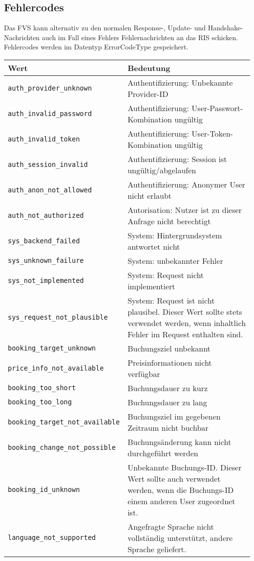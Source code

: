 \subsection*{Fehlercodes}
Das FVS kann alternativ zu den normalen Response-, Update- und Handshake-Nachrichten auch im Fall eines Fehlers Fehlernachrichten an das RIS schicken. Fehlercodes werden im Datentyp ErrorCodeType gespeichert.
\begin{flushleft}
\begin{tabularx}{\linewidth}{l>{\raggedright\arraybackslash}X} 
\toprule
Wert & Bedeutung\\
\midrule
\verb|auth_provider_unknown| & Authentifizierung: Unbekannte Provider-ID\\
\verb|auth_invalid_password| & Authentifizierung: User-Passwort-Kombination ungültig\\
\verb|auth_invalid_token| & Authentifizierung: User-Token-Kombination ungültig\\
\verb|auth_session_invalid| & Authentifizierung: Session ist ungültig/abgelaufen\\
\verb|auth_anon_not_allowed| & Authentifizierung: Anonymer User nicht erlaubt\\
\verb|auth_not_authorized| & Autorisation: Nutzer ist zu dieser Anfrage nicht berechtigt\\
\verb|sys_backend_failed| & System: Hintergrundsystem antwortet nicht\\
\verb|sys_unknown_failure| & System: unbekannter Fehler\\
\verb|sys_not_implemented| & System: Request nicht implementiert\\
\verb|sys_request_not_plausible| & System: Request ist nicht plausibel. Dieser Wert sollte stets verwendet werden, wenn inhaltlich Fehler im Request enthalten sind.\\
\verb|booking_target_unknown| & Buchungsziel unbekannt\\
\verb|price_info_not_available| & Preisinformationen nicht verfügbar\\
\verb|booking_too_short| & Buchungsdauer zu kurz\\
\verb|booking_too_long| & Buchungsdauer zu lang\\
\verb|booking_target_not_available| & Buchungsziel im gegebenen Zeitraum nicht buchbar\\
\verb|booking_change_not_possible| & Buchungsänderung kann nicht durchgeführt werden\\
\verb|booking_id_unknown| & Unbekannte Buchungs-ID. Dieser Wert sollte auch verwendet werden, wenn die Buchungs-ID einem anderen User zugeordnet ist.\\
\verb|language_not_supported| & Angefragte Sprache nicht vollständig unterstützt, andere Sprache geliefert.\\
\bottomrule
\end{tabularx}
\end{flushleft}